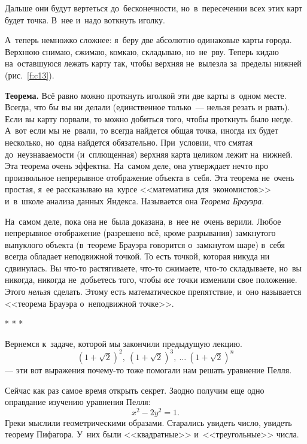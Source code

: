 
Дальше они будут вертеться до~бесконечности, но~в~пересечении всех этих карт будет точка. В~нее
и~надо воткнуть иголку.

А~теперь немножко сложнее: я~беру две абсолютно одинаковые карты города. Верхнюю снимаю, сжимаю,
комкаю, складываю, но~не~рву. Теперь кидаю на~оставшуюся лежать карту так, чтобы верхняя не~вылезла
за~пределы нижней (рис.~\ref{f:c13}).



\textbf{Теорема.} Всё равно можно проткнуть иголкой эти две карты в~одном месте. Всегда, что бы вы
ни делали (единственное только~--- нельзя резать и рвать). Если вы карту порвали, то можно добиться
того, чтобы проткнуть было негде. А~вот если мы не~рвали, то всегда найдется общая точка, иногда их
будет несколько, но~одна найдется обязательно. При~условии, что смятая до~неузнаваемости
(и~сплющенная) верхняя карта целиком лежит на~нижней. Эта теорема очень эффектна. На~самом деле,
она утверждает нечто про произвольное непрерывное отображение объекта в~себя. Эта теорема не~очень
простая, я~ее рассказываю на~курсе <<математика для~экономистов>> и~в~школе анализа данных Яндекса.
Называется она \textit{Теорема Брауэра}.

На~самом деле, пока она не~была доказана, в~нее не~очень верили. Любое непрерывное отображение
(разрешено всё, кроме разрывания) замкнутого выпуклого объекта (в~теореме Брауэра говорится
о~замкнутом шаре) в~себя всегда обладает неподвижной точкой.
 То есть точкой, которая никуда ни сдвинулась. Вы что-то растягиваете, что-то сжимаете, что-то
складываете, но~вы никогда, никогда не~добьетесь того, чтобы \textit{все} точки изменили свое
положение. Этого \textit{нельзя} сделать. Этому есть математическое препятствие, и~оно называется
<<теорема Брауэра о~неподвижной точке>>.

\centerline{* * *}

\pagebreak

Вернемся к~задаче, которой мы закончили предыдущую лекцию.
$$
(1+\sqrt2)^{2},\
(1+\sqrt{2})^{3},\
\ldots\
(1+\sqrt2)^{n}
$$
--- эти вот выражения почему-то тоже помогали нам решать уравнение Пелля.

Сейчас как раз самое время открыть секрет. Заодно получим еще одно оправдание изучению уравнения Пелля:
$$
x^{2}-2y^{2}=1.
$$
Греки мыслили геометрическими образами. Старались увидеть число, увидеть теорему Пифагора. У~них были <<квадратные>> и~<<треугольные>> числа.

